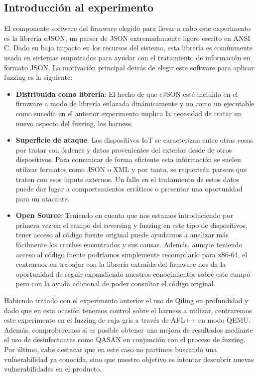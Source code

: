 \subsection{Introducción al experimento}
El componente software del firmware elegido para llevar a cabo este experimento es la librería cJSON\cite{cJSON}, un parser de JSON extremadamente 
ligero escrito en ANSI C. Dado su bajo impacto en los recursos del sistema, esta librería es comúnmente usada en sistemas empotrados para
ayudar con el tratamiento de información en formato JSON. La motivación principal detrás de elegir este software para aplicar fuzzing es
la siguiente:
\begin{itemize}
    \item \textbf{Distribuida como librería}: El hecho de que cJSON esté incluido en el firmware a modo de librería enlazada dinámicamente y no como un ejecutable
    como sucedía en el anterior experimento implica la necesidad de tratar un nuevo aspecto del fuzzing, los harness.
    \item \textbf{Superficie de ataque}: Los dispositivos IoT se caracterizan entre otras cosas por tratar con órdenes y datos provenientes del exterior
    desde de otros dispositivos. Para comunicar de forma eficiente esta información se suelen utilizar formatos como JSON o XML y por tanto, se 
    requerirán parsers que traten con esos inputs externos. Un fallo en el tratamiento de estos datos puede dar lugar a comportamientos erráticos o 
    presentar una oportunidad para un atacante.
    \item \textbf{Open Source}: Teniendo en cuenta que nos estamos introduciendo por primera vez en el campo del reversing y fuzzing en este tipo de 
    dispositivos, tener acceso al código fuente original puede ayudarnos a analizar más fácilmente los crashes encontrados y sus causas. Además, 
    aunque teniendo acceso al código fuente podríamos simplemente recompilarlo para x86-64, el centrarnos en trabajar con la librería extraída del firmware 
    nos da la oportunidad de seguir expandiendo nuestros conocimientos sobre este campo pero con la ayuda adicional de poder consultar el código original.
\end{itemize}

Habiendo tratado con el experimento anterior el uso de Qiling en profundidad y dado que en esta ocasión tenemos control sobre el harness a utilizar, centraremos
este experimento en el fuzzing de caja gris a través de AFL++ en modo QEMU. Además, comprobaremos si es posible obtener una mejora de resultados mediante 
el uso de desinfectantes como QASAN en conjunción con el proceso de fuzzing. Por último, cabe destacar que en este caso no partimos buscando una vulnerabilidad
ya conocida, sino que nuestro objetivo es intentar descubrir nuevas vulnerabilidades en el producto.

